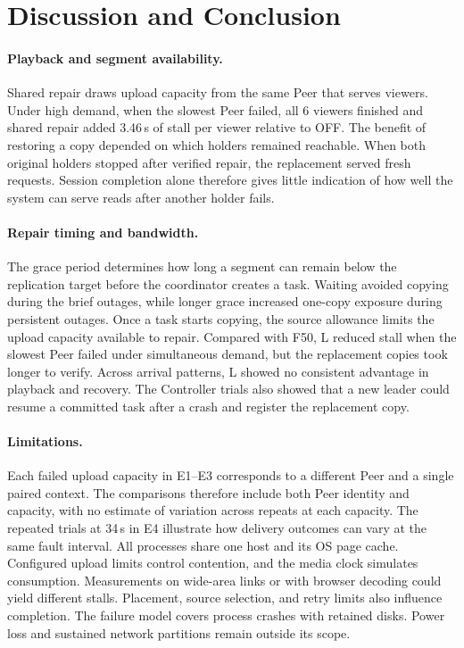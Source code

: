 \section{Discussion and Conclusion}

\paragraph{Playback and segment availability.}
Shared repair draws upload capacity from the same Peer that serves
viewers. Under high demand, when the slowest Peer failed, all 6 viewers
finished and shared repair added 3.46\,s of stall per viewer relative to
OFF. The benefit of restoring a copy depended on which holders remained
reachable. When both original
holders stopped after verified repair, the replacement served fresh
requests. Session completion alone therefore gives little indication of
how well the system can serve reads after another holder fails.

\paragraph{Repair timing and bandwidth.}
The grace period determines how long a segment can remain below the
replication target before the coordinator creates a task. Waiting avoided
copying during the brief outages, while longer grace increased one-copy
exposure during persistent outages. Once a task starts copying, the
source allowance limits the upload capacity available to repair.
Compared with F50, L reduced stall when the slowest Peer failed under
simultaneous demand, but the replacement copies took longer to verify.
Across arrival patterns, L showed no consistent advantage in playback
and recovery. The Controller trials also showed that a new leader could
resume a committed task after a crash and register the replacement copy.

\paragraph{Limitations.}
Each failed upload capacity in E1--E3 corresponds to a different Peer
and a single paired context. The comparisons therefore include both
Peer identity and capacity, with no estimate of variation across repeats
at each capacity. The repeated trials at 34\,s in E4 illustrate how
delivery outcomes can vary at the same fault interval. All processes
share one host and its OS page cache. Configured upload limits control
contention, and the media clock simulates consumption. Measurements on
wide-area links or with browser decoding could yield different stalls.
Placement, source selection, and retry limits also influence completion.
The failure model covers process crashes with retained disks. Power loss
and sustained network partitions remain outside its scope.

